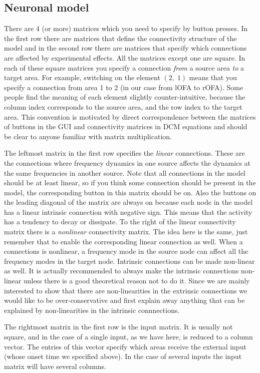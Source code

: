\subsection{Neuronal model}
There are 4 (or more) matrices which you need to specify by button presses. In the first row there are matrices that define the connectivity structure of the model and in the second row there are matrices that specify which connections are affected by experimental effects. All the matrices except one are square. In each of these square matrices you specify a connection \textit{from} a source area \textit{to} a target area. For example, switching on the element $(2,\;1)$ means that you specify a connection from area 1 to 2 (in our case from lOFA to rOFA). Some people find the meaning of each element slightly counter-intuitive, because the column index corresponds to the source area, and the row index to the target area. This convention is motivated by direct correspondence between the matrices of buttons in the GUI and connectivity matrices in DCM equations and should be clear to anyone familiar with matrix multiplication.

The leftmost matrix in the first row specifies the \textit{linear} connections. These are the connections where frequency dynamics in one source affects the dynamics at the same frequencies in another source. Note that all connections in the model should be at least linear, so if you think some connection should be present in the model, the corresponding button in this matrix should be on. Also the buttons on the leading diagonal of the matrix are always on because each node in the model has a linear  intrinsic connection with negative sign. This means that the activity has a tendency to decay or dissipate. To the right of the linear connectivity matrix there is a \textit{nonlinear} connectivity matrix. The idea here is the same, just remember that to enable the corresponding linear connection as well. When a connections is nonlinear, a frequency mode in the source node can affect all the frequency modes in the target node. Intrinsic connections can be made non-linear as well. It is actually recommended to always make the intrinsic connections non-linear unless there is a good theoretical reason not to do it. Since we are mainly interested to show that there are non-linearities in the extrinsic connections we would like to be over-conservative and first explain away anything that can be explained by non-linearities in the intrinsic connnections.

The rightmost matrix in the first row is the input matrix. It is usually not square, and in the case of a single input, as we have here, is reduced to a column vector. The entries of this vector specify which areas receive the external input (whose onset time we specified above). In the case of several inputs the input matrix will have several columns.

